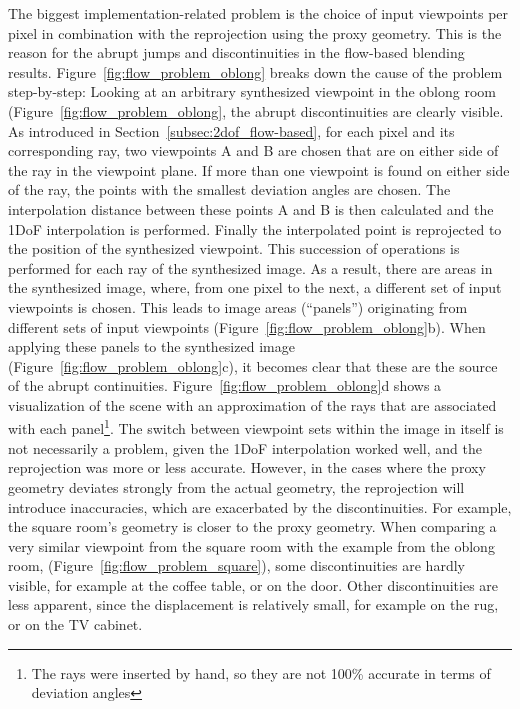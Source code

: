 The biggest implementation-related problem is the choice of input viewpoints per pixel in combination with the reprojection using the proxy geometry. This is the reason for the abrupt jumps and discontinuities in the flow-based blending results. Figure~\ref{fig:flow_problem_oblong} breaks down the cause of the problem step-by-step: Looking at an arbitrary synthesized viewpoint in the oblong room (Figure~\ref{fig:flow_problem_oblong}, the abrupt discontinuities are clearly visible. As introduced in Section~\ref{subsec:2dof_flow-based}, for each pixel and its corresponding ray, two viewpoints A and B are chosen that are on either side of the ray in the viewpoint plane. If more than one viewpoint is found on either side of the ray, the points with the smallest deviation angles are chosen. The interpolation distance between these points A and B is then calculated and the 1DoF interpolation is performed. Finally the interpolated point is reprojected to the position of the synthesized viewpoint. This succession of operations is performed for each ray of the synthesized image. As a result, there are areas in the synthesized image, where, from one pixel to the next, a different set of input viewpoints is chosen. This leads to image areas (``panels'') originating from different sets of input viewpoints (Figure~\ref{fig:flow_problem_oblong}b). When applying these panels to the synthesized image (Figure~\ref{fig:flow_problem_oblong}c), it becomes clear that these are the source of the abrupt continuities. Figure~\ref{fig:flow_problem_oblong}d shows a visualization of the scene with an approximation of the rays that are associated with each panel\footnote{The rays were inserted by hand, so they are not 100\% accurate in terms of deviation angles}. The switch between viewpoint sets within the image in itself is not necessarily a problem, given the 1DoF interpolation worked well, and the reprojection was more or less accurate. However, in the cases where the proxy geometry deviates strongly from the actual geometry, the reprojection will introduce inaccuracies, which are exacerbated by the discontinuities.
For example, the square room's geometry is closer to the proxy geometry. When comparing a very similar viewpoint from the square room with the example from the oblong room, (Figure~\ref{fig:flow_problem_square}), some discontinuities are hardly visible, for example at the coffee table, or on the door. Other discontinuities are less apparent, since the displacement is relatively small, for example on the rug, or on the TV cabinet.


